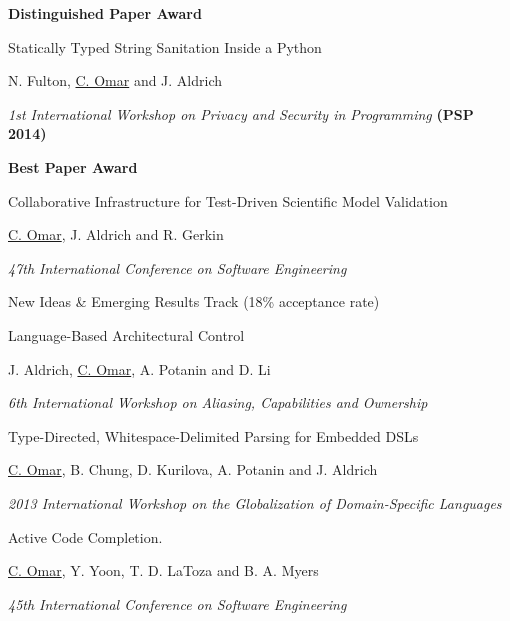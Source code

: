 \documentclass[10pt,letterpaper]{article}
\renewenvironment{itemize}{
  \begin{list}{}{
    \setlength{\leftmargin}{1.25em}
    \setlength{\itemsep}{0.25em}
    \setlength{\parskip}{0pt}
    \setlength{\parsep}{0.2em}
  }
}{
  \end{list}
}
\begin{document}
\begin{enumerate}[leftmargin=*, labelindent=6.5em, font=\bfseries]
\begin{itemize}
          \item \textbf{Distinguished Paper Award}
        \end{itemize}
  \item[PSP 2014] Statically Typed String Sanitation Inside a Python
        \begin{itemize}
          \item N. Fulton, \underline{C. Omar} and J. Aldrich
          \item \textit{1st International Workshop on Privacy and Security in Programming} {\textbf{(PSP 2014)}}
          \item \textbf{Best Paper Award}
        \end{itemize}
  \item[ICSE 2014] Collaborative Infrastructure for Test-Driven Scientific Model Validation
        \begin{itemize}
          \item \underline{C. Omar}, J. Aldrich and R. Gerkin
          \item \textit{47th International Conference on Software Engineering}
          \item New Ideas \& Emerging Results Track (18\% acceptance rate)
        \end{itemize}
  \item[IWACO 2014] Language-Based Architectural Control
        \begin{itemize}
          \item J. Aldrich, \underline{C. Omar}, A. Potanin and D. Li
          \item \textit{6th International Workshop on Aliasing, Capabilities and Ownership}
        \end{itemize}
  \item[GlobalDSL 2013] Type-Directed, Whitespace-Delimited Parsing for Embedded DSLs
        \begin{itemize}
          \item \underline{C. Omar}, B. Chung, D. Kurilova, A. Potanin and J. Aldrich
          \item \textit{2013 International Workshop on the Globalization of Domain-Specific Languages}
        \end{itemize}
  \item[ICSE 2012] {Active Code Completion}.
        \begin{itemize}
          \item \underline{C. Omar}, Y. Yoon, T. D. LaToza and B. A. Myers
          \item \textit{45th International Conference on Software Engineering}

\end{itemize}
\end{enumerate}
\end{document}
